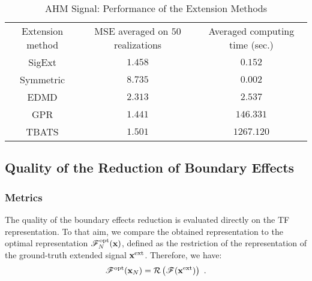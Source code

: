 \begin{table}
\centering
\caption{AHM Signal: Performance of the Extension Methods}
\begin{tabular}{|c||c|c|}
  \hline
   \multirow{2}{40pt}{\centering Extension method} & \multirow{2}{70pt}{\centering MSE averaged on $50$ realizations}  & \multirow{2}{80pt}{\centering Averaged computing time (sec.)} \\
    &  & \\
   \hhline{|=#=|=|}
   {\sf SigExt} & $1.458$ & $0.152$ \\
   \hline
   Symmetric & $8.735$ & $0.002$ \\
   \hline
   EDMD & $2.313$ &$2.537$\\
   \hline
   GPR & $1.441$ &$146.331$ \\
   \hline
   TBATS & $1.501$ & $1267.120$ \\
   \hline
\end{tabular}
\label{tab:mse.sine}
\end{table} 


\subsection{Quality of the Reduction of Boundary Effects}

\subsubsection{Metrics}
The quality of the boundary effects reduction is evaluated directly on the TF representation. To that aim, we compare the obtained representation to the optimal representation ${\mathscr F}_N^\mathrm{opt}({\mathbf x})$, defined as the restriction of the representation of the ground-truth extended signal ${\mathbf x}^\mathrm{ext}$. Therefore, we have:
\begin{equation}
\ccF^\mathrm{opt}(\bx_N) = \cR\left( \ccF(\bx^\mathrm{ext}) \right) \ .
\label{eq:opt.TFR}
\end{equation} 


